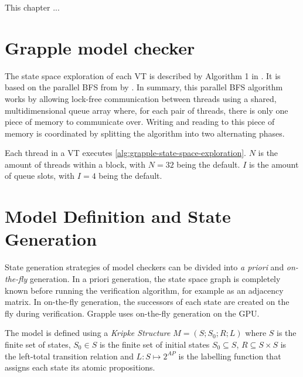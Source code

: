 \documentclass[
fancyheadings, %
%
%
]{stsreprt}
\newcommand{\citeinline}[1]{\citetitle{#1} by \citeauthor*{#1} \cite{#1}}
\begin{document}
This chapter ...

\section{Grapple model checker}
\label{section:theory:grapple-model-checker}

The state space exploration of each VT is described by Algorithm 1 in \cite{DeFrancisco2020.Grapple}.
It is based on the parallel BFS from \citeinline{Holzmann2012.Paralellizing-SPIN}.
In summary, this parallel BFS algorithm works by allowing lock-free communication between threads using a shared, multidimensional queue array where, for each pair of threads, there is only one piece of memory to communicate over.
Writing and reading to this piece of memory is coordinated by splitting the algorithm into two alternating phases.

Each thread in a VT executes \cref{alg:grapple-state-space-exploration}.
$N$ is the amount of threads within a block, with $N = 32$ being the default.
$I$ is the amount of queue slots, with $I = 4$ being the default. %


\section{Model Definition and State Generation}
\label{section:theory:model-definition-state-generation}

State generation strategies of model checkers can be divided into \emph{a priori} and \emph{on-the-fly} generation.
In a priori generation, the state space graph is completely known before running the verification algorithm, for example as an adjacency matrix.
In on-the-fly generation, the successors of each state are created on the fly during verification.
Grapple uses on-the-fly generation on the GPU.

The model is defined using a \emph{Kripke Structure} $M = \left(S; S_0; R; L \right)$ where $S$ is the finite set of states, $S_0 \in S$ is the finite set of initial states $S_0 \subseteq S$, $R \subseteq S \times S$ is the left-total transition relation and $L : S \mapsto 2^{AP}$ is the labelling function that assigns each state its atomic propositions.
\end{document}
